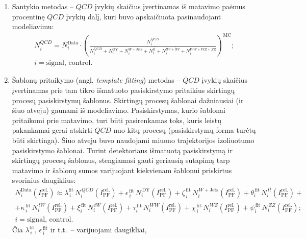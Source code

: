 \documentclass[a4paper, 12pt, oneside]{article}
\newcommand{\tbarW}{\bar{t}W}
\newcommand{\ttbar}{t\bar{t}}
\newcommand{\QCD}{QC\! D}
\begin{document}
\begin{enumerate}
	\item Santykio metodas -- $\QCD$ įvykių skaičius įvertinamas iš matavimo paėmus procentinę $QCD$ įvykių dalį, kuri buvo apskaičiuota
	pasinaudojant modeliavimu:
	\begin{multline}
		N^{\QCD}_{i} = N^{\mathrm{Data}}_{i} \cdot \left(\frac{N^{\QCD}_{i}}
		{N^{\QCD}_{i} + N^{\mathrm{DY}}_{i} + N^{W+\mathrm{Jets}}_{i} +
		N^{\ttbar}_{i} + N^{tW+\tbarW}_{i} + N^{WW+WZ+ZZ}_{i}} \right)^{\mathrm{MC}}; \\ i = \mathrm{signal}, \, \mathrm{control}.
	\end{multline}
	\item Šablonų pritaikymo (angl. \textit{template fitting}) metodas -- $\QCD$ įvykių skaičius įvertinamas prie tam tikro
	išmatuoto pasiskirstymo pritaikius skirtingų procesų pasiskirstymų šablonus.
	Skirtingų procesų šablonai dažniausiai (ir šiuo atveju) gaunami iš modeliavimo.
	Pasiskirstymas, kurio šablonai pritaikomi prie matavimo, turi būti pasirenkamas toks, kuris leistų pakankamai gerai
	atskirti $\QCD$ nuo kitų procesų (pasiskirstymų forma turėtų būti skirtinga).
	Šiuo atveju buvo naudojami miuono trajektorijos izoliuotumo pasiskirstymo šablonai.
	Turint detektoriaus išmatuotą pasiskirstymą ir skirtingų procesų šablonus, stengiamasi gauti geriausią sutapimą tarp matavimo ir
	šablonų sumos varijuojant kiekvienam šablonui priskirtus svorinius daugiklius:
	\begin{multline}
		N^{\mathrm{Data}}_{i}(I^{\mathrm{rel.}}_{\mathrm{PF}}) \approx
		\lambda^{\mathrm{fit}}_{\,i}\, N^{\,\QCD}_{i}(I^{\mathrm{rel.}}_{\mathrm{PF}}) +
		\epsilon^{\,\mathrm{fit}}_{\,i}\, N^{\,\mathrm{DY}}_{i}(I^{\mathrm{rel.}}_{\mathrm{PF}}) +
		\zeta^{\,\mathrm{fit}}_{\,i}\, N^{\,W+\mathrm{Jets}}_{i}(I^{\mathrm{rel.}}_{\mathrm{PF}}) +
		\theta^{\,\mathrm{fit}}_{i}\, N^{\,\ttbar}_{i}(I^{\mathrm{rel.}}_{\mathrm{PF}}) + \\[7pt] +
		\kappa^{\,\mathrm{fit}}_{\,i}\, N^{\,tW}_{i}(I^{\mathrm{rel.}}_{\mathrm{PF}}) + 
		\xi^{\,\mathrm{fit}}_{i}\, N^{\,\tbarW}_{i}(I^{\mathrm{rel.}}_{\mathrm{PF}}) +
		\tau^{\,\mathrm{fit}}_{i}\, N^{\,WW}_{i}(I^{\mathrm{rel.}}_{\mathrm{PF}}) +
		\chi^{\,\mathrm{fit}}_{\,i}\, N^{\,W\!Z}_{i}(I^{\mathrm{rel.}}_{\mathrm{PF}}) +
		\psi^{\,\mathrm{fit}}_{i}\, N^{\,Z\!Z}_{i}(I^{\mathrm{rel.}}_{\mathrm{PF}}); \\ i = \mathrm{signal}, \, \mathrm{control}.
	\end{multline}
	Čia $\lambda^{\mathrm{fit}}_{\,i}$, $\epsilon^{\,\mathrm{fit}}_{\,i}$ ir t.t.\ -- varijuojami daugikliai,

\end{enumerate}
\end{document}
